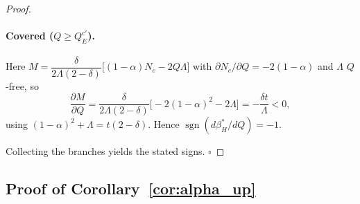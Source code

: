 \begin{proof}
\paragraph{Covered ($Q\ge Q^{c'}_{E}$).}
Here $M=\dfrac{\delta}{2\Lambda(2-\delta)}\bigl[(1-\alpha)N_c-2Q\Lambda\bigr]$ with
$\partial N_c/\partial Q=-2(1-\alpha)$ and $\Lambda$ $Q$-free, so
\[
\frac{\partial M}{\partial Q}
=\frac{\delta}{2\Lambda(2-\delta)}\bigl[-2(1-\alpha)^{2}-2\Lambda\bigr]
=-\frac{\delta t}{\Lambda}<0,
\]
using $(1-\alpha)^{2}+\Lambda=t(2-\delta)$. Hence $\operatorname{sgn}(d\beta_H^*/dQ)=-1$.

Collecting the branches yields the stated signs. \hfill$\square$
\end{proof}


\subsection*{Proof of Corollary~\ref{cor:alpha_up}}
